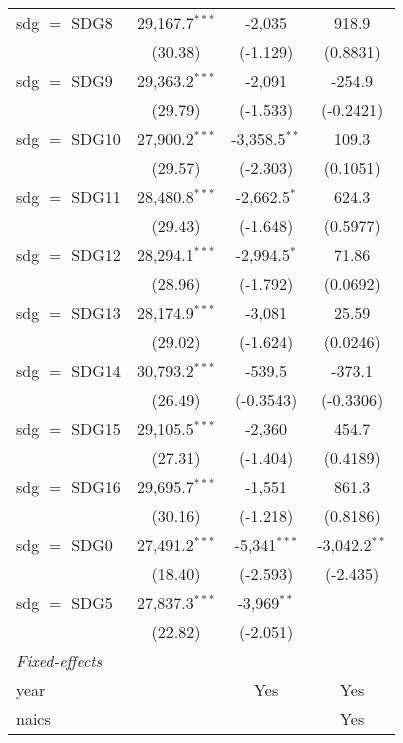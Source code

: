 \begin{tabular}{lccc}
   sdg $=$ SDG8  & 29,167.7$^{***}$ & -2,035           & 918.9\\   
                 & (30.38)          & (-1.129)         & (0.8831)\\   
   sdg $=$ SDG9  & 29,363.2$^{***}$ & -2,091           & -254.9\\   
                 & (29.79)          & (-1.533)         & (-0.2421)\\   
   sdg $=$ SDG10 & 27,900.2$^{***}$ & -3,358.5$^{**}$  & 109.3\\   
                 & (29.57)          & (-2.303)         & (0.1051)\\   
   sdg $=$ SDG11 & 28,480.8$^{***}$ & -2,662.5$^{*}$   & 624.3\\   
                 & (29.43)          & (-1.648)         & (0.5977)\\   
   sdg $=$ SDG12 & 28,294.1$^{***}$ & -2,994.5$^{*}$   & 71.86\\   
                 & (28.96)          & (-1.792)         & (0.0692)\\   
   sdg $=$ SDG13 & 28,174.9$^{***}$ & -3,081           & 25.59\\   
                 & (29.02)          & (-1.624)         & (0.0246)\\   
   sdg $=$ SDG14 & 30,793.2$^{***}$ & -539.5           & -373.1\\   
                 & (26.49)          & (-0.3543)        & (-0.3306)\\   
   sdg $=$ SDG15 & 29,105.5$^{***}$ & -2,360           & 454.7\\   
                 & (27.31)          & (-1.404)         & (0.4189)\\   
   sdg $=$ SDG16 & 29,695.7$^{***}$ & -1,551           & 861.3\\   
                 & (30.16)          & (-1.218)         & (0.8186)\\   
   sdg $=$ SDG0  & 27,491.2$^{***}$ & -5,341$^{***}$   & -3,042.2$^{**}$\\   
                 & (18.40)          & (-2.593)         & (-2.435)\\   
   sdg $=$ SDG5  & 27,837.3$^{***}$ & -3,969$^{**}$    &   \\   
                 & (22.82)          & (-2.051)         &   \\   
   \midrule
   \emph{Fixed-effects}\\
   year          &                  & Yes              & Yes\\  
   naics         &                  &                  & Yes\\  

\end{tabular}
